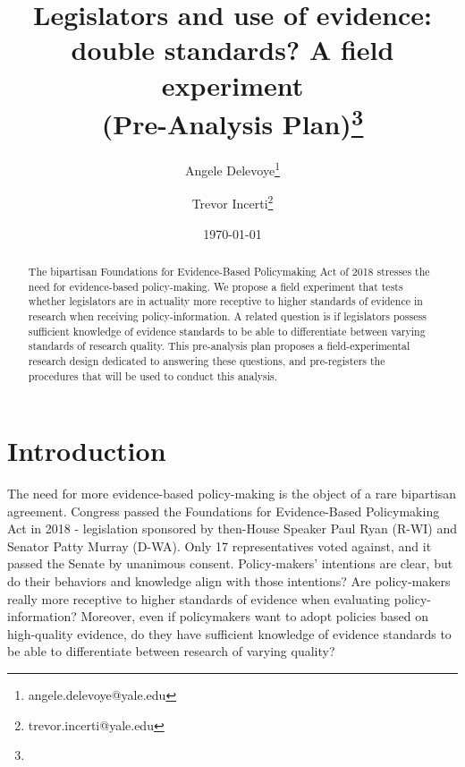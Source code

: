 \documentclass[12pt,final,fleqn]{article}
\theoremstyle{plain}
\begin{document}
\singlespace
\title{\textbf{Legislators and use of evidence: double standards? A field experiment \\
(Pre-Analysis Plan)}\vspace{-1ex}\thanks{}}
\author{Angele Delevoye\thanks{angele.delevoye@yale.edu}\vspace{-1ex}}
\author{Trevor Incerti\thanks{trevor.incerti@yale.edu}\vspace{-1ex}}
\date{\today}
\maketitle

\begin{abstract}
\noindent
The bipartisan Foundations for Evidence-Based Policymaking Act of 2018 stresses the need for evidence-based policy-making. We propose a field experiment that tests whether legislators are in actuality more receptive to higher standards of evidence in research when receiving policy-information. A related question is if legislators possess sufficient knowledge of evidence standards to be able to differentiate between varying standards of research quality. This pre-analysis plan proposes a field-experimental research design dedicated to answering these questions, and pre-registers the procedures that will be used to conduct this analysis.
\end{abstract}

\pagebreak

\doublespace

\begin{center}
\end{center}

\section{Introduction} \label{sec:Introduction}

The need for more evidence-based policy-making is the object of a rare bipartisan agreement. Congress passed the Foundations for Evidence-Based Policymaking Act in 2018 - legislation sponsored by then-House Speaker Paul Ryan (R-WI) and Senator Patty Murray (D-WA). Only 17 representatives voted against, and it passed the Senate by unanimous consent. Policy-makers' intentions are clear, but do their behaviors and knowledge align with those intentions? Are policy-makers really more receptive to higher standards of evidence when evaluating policy-information? Moreover, even if policymakers want to adopt policies based on high-quality evidence, do they have sufficient knowledge of evidence standards to be able to differentiate between research of varying quality? 
\end{document}
